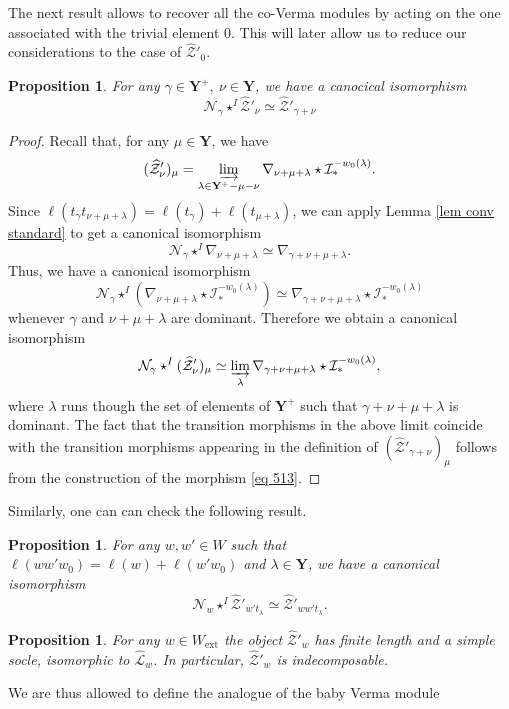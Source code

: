 \documentclass[11pt]{amsart}
\theoremstyle{plain}
\newtheorem{prop}[thm]{Proposition}
\theoremstyle{remark}
\numberwithin{equation}{section}
\begin{document}
	The next result allows to recover all the co-Verma modules by acting on the one associated with the trivial element $0$. This will later allow us to reduce our considerations to the case of $\widehat{\mathcal{Z}}'_0$.
	\begin{prop}\label{prop convolution costandard}
		For any  $\gamma\in\mathbf{Y}^+,~\nu\in\mathbf{Y}$, we have a canocical isomorphism
		$$ \mathcal{N}_\gamma\star^I\widehat{\mathcal{Z}}'_\nu\simeq \widehat{\mathcal{Z}}'_{\gamma+\nu} $$
	\end{prop}
	\begin{proof}
		Recall that, for any $\mu\in\mathbf{Y}$, we have
		$$(\widehat{\mathcal{Z}}'_\nu)_\mu=\varinjlim_{\lambda\in\mathbf{Y}^+-\mu-\nu} \nabla_{\nu+\mu+\lambda}\star \mathcal{I}^{-w_0(\lambda)}_*.$$
		Since $\ell(t_\gamma t_{\nu+\mu+\lambda})=\ell(t_\gamma)+\ell(t_{\mu+\lambda})$, we can apply  Lemma \ref{lem conv standard} to get a canonical isomorphism
		$$\mathcal{N}_\gamma\star^I\nabla_{\nu+\mu+\lambda}\simeq\nabla_{\gamma+\nu+\mu+\lambda}.$$
		Thus, we have a canonical isomorphism 
		$$\mathcal{N}_\gamma\star^I(\nabla_{\nu+\mu+\lambda}\star \mathcal{I}^{-w_0(\lambda)}_*)\simeq \nabla_{\gamma+\nu+\mu+\lambda}\star \mathcal{I}^{-w_0(\lambda)}_*$$ whenever $\gamma$ and $\nu+\mu+\lambda$ are dominant. Therefore we obtain a canonical isomorphism
		$$\mathcal{N}_\gamma\star^I(\widehat{\mathcal{Z}}'_\nu)_\mu\simeq \varinjlim_{\lambda} \nabla_{\gamma+\nu+\mu+\lambda}\star \mathcal{I}^{-w_0(\lambda)}_*, $$
		where $\lambda$ runs though the set of elements of $\mathbf{Y}^+$ such that $\gamma+\nu+\mu+\lambda$ is dominant. The fact that the transition morphisms in the above limit coincide with the transition morphisms appearing in the definition of $(\widehat{\mathcal{Z}}'_{\gamma+\nu})_\mu$ follows from the construction of the morphism \eqref{eq 513}.
	\end{proof}
 Similarly, one can can check the following result.
 \begin{prop}\label{prop convolution costandard 2}
     For any $w,w'\in W$ such that $\ell(ww'w_0)=\ell(w)+\ell(w'w_0)$ and $\lambda\in \mathbf{Y}$, we have a canonical isomorphism
     $$ \mathcal{N}_{w}\star^I\widehat{\mathcal{Z}}'_{w't_\lambda}\simeq \widehat{\mathcal{Z}}'_{ww't_\lambda}. $$
 \end{prop}
	\begin{prop}{{\cite[Corollary 6.9]{achar2022geometric}}}\label{prop head}
		For any $w\in W_{\mathrm{ext}}$ the object $\widehat{\mathcal{Z}}'_w$ has finite length and a simple socle, isomorphic to $\widehat{\mathcal{L}}_w$. In particular, $\widehat{\mathcal{Z}}'_w$ is indecomposable.
	\end{prop}
	We are thus allowed to define the analogue of the baby Verma module
	
\end{document}
